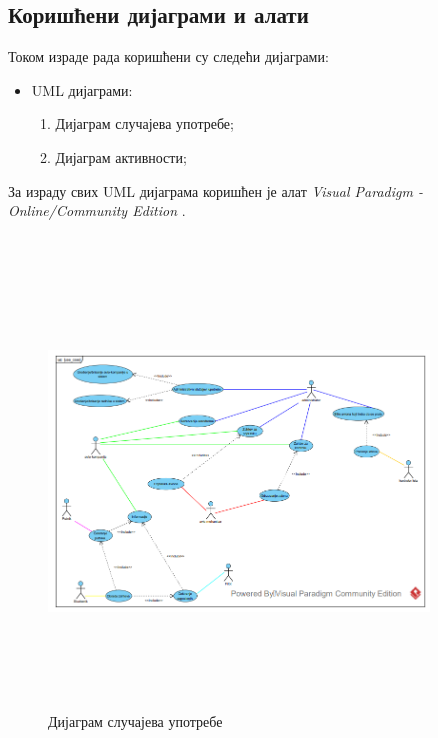 \documentclass{article}
\begin{document}
\subsection{Коришћени дијаграми и алати}
Током израде рада коришћени су следећи дијаграми:
\begin{itemize}
    \item UML дијаграми:
        \begin{enumerate}
            \item Дијаграм случајева употребе;
            \item Дијаграм активности;
        \end{enumerate}
\end{itemize}

За израду свих UML дијаграма
коришћен је алат 
\textit{Visual Paradigm - Online/Community Edition} \cite{vs}.\\\\

\begin{figure}[h!]
\centering
\includegraphics[width=0.9\textwidth, height=12cm]{Dijagrami_slike/uc_diagram.png}
\caption{\label{fig:uc_diagram}Дијаграм случајева употребе}
\end{figure}
\end{document}

